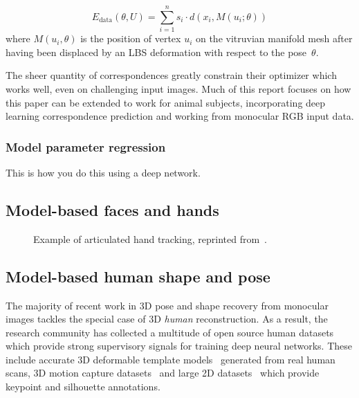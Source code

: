     \begin{equation}
        E_{\text{data}}(\theta,U) =\sum_{i=1}^{n}s_{i} \cdot d(x_{i}, M(u_{i}; \theta))
    \end{equation}
    where $M(u_{i}, \theta)$ is the position of vertex $u_{i}$ on the vitruvian manifold mesh after having been displaced by an LBS deformation with respect to the pose~$\theta$. 

    The sheer quantity of correspondences greatly constrain their optimizer which works well, even on challenging input images. Much of this report focuses on how this paper can be extended to work for animal subjects, incorporating deep learning correspondence prediction and working from monocular RGB input data.

\subsubsection{Model parameter regression}

    This is how you do this using a deep network. 


\subsection{Model-based faces and hands}


\begin{figure}[H] %
    \caption{Example of articulated hand tracking, reprinted from~\cite{taylor2016efficient}.}
    \label{fig:hand_tracking}
\end{figure}


\subsection{Model-based human shape and pose}


The majority of recent work in 3D pose and shape recovery from monocular images tackles the special case of 3D \emph{human} reconstruction. As a result, the research community has collected a multitude of open source human datasets which provide strong supervisory signals for training deep neural networks. These include accurate 3D deformable template models~\cite{loper15smpl} generated from real human scans, 3D motion capture datasets~\cite{ionescu2013human3,vonmarcard2018recovering} and large 2D datasets~\cite{lin2014microsoft,johnson2010clustered,andriluka14cvpr} which provide keypoint and silhouette annotations. 

